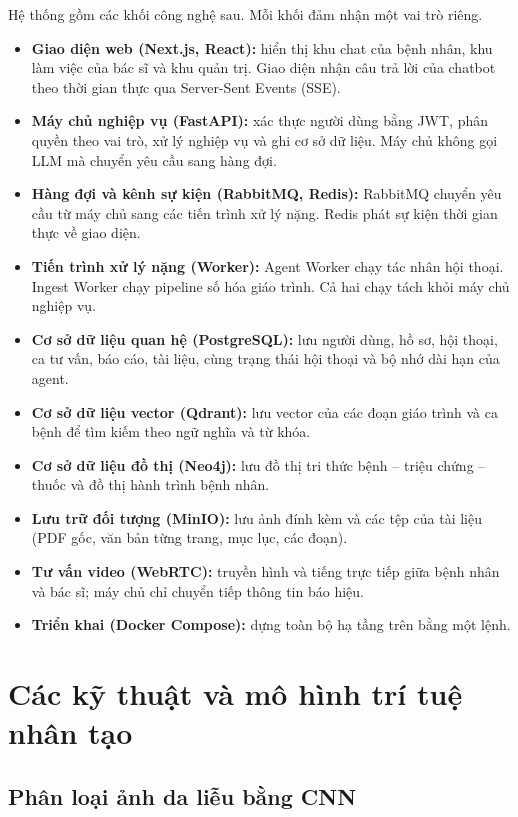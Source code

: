 Hệ thống gồm các khối công nghệ sau. Mỗi khối đảm nhận một vai trò riêng.

\begin{itemize}
  \item \textbf{Giao diện web (Next.js, React):} hiển thị khu chat của bệnh nhân, khu làm việc của bác sĩ và khu quản trị. Giao diện nhận câu trả lời của chatbot theo thời gian thực qua Server-Sent Events (SSE).
  \item \textbf{Máy chủ nghiệp vụ (FastAPI):} xác thực người dùng bằng JWT, phân quyền theo vai trò, xử lý nghiệp vụ và ghi cơ sở dữ liệu. Máy chủ không gọi LLM mà chuyển yêu cầu sang hàng đợi.
  \item \textbf{Hàng đợi và kênh sự kiện (RabbitMQ, Redis):} RabbitMQ chuyển yêu cầu từ máy chủ sang các tiến trình xử lý nặng. Redis phát sự kiện thời gian thực về giao diện.
  \item \textbf{Tiến trình xử lý nặng (Worker):} Agent Worker chạy tác nhân hội thoại. Ingest Worker chạy pipeline số hóa giáo trình. Cả hai chạy tách khỏi máy chủ nghiệp vụ.
  \item \textbf{Cơ sở dữ liệu quan hệ (PostgreSQL):} lưu người dùng, hồ sơ, hội thoại, ca tư vấn, báo cáo, tài liệu, cùng trạng thái hội thoại và bộ nhớ dài hạn của agent.
  \item \textbf{Cơ sở dữ liệu vector (Qdrant):} lưu vector của các đoạn giáo trình và ca bệnh để tìm kiếm theo ngữ nghĩa và từ khóa.
  \item \textbf{Cơ sở dữ liệu đồ thị (Neo4j):} lưu đồ thị tri thức bệnh -- triệu chứng -- thuốc và đồ thị hành trình bệnh nhân.
  \item \textbf{Lưu trữ đối tượng (MinIO):} lưu ảnh đính kèm và các tệp của tài liệu (PDF gốc, văn bản từng trang, mục lục, các đoạn).
  \item \textbf{Tư vấn video (WebRTC):} truyền hình và tiếng trực tiếp giữa bệnh nhân và bác sĩ; máy chủ chỉ chuyển tiếp thông tin báo hiệu.
  \item \textbf{Triển khai (Docker Compose):} dựng toàn bộ hạ tầng trên bằng một lệnh.
\end{itemize}

\section{Các kỹ thuật và mô hình trí tuệ nhân tạo}

\subsection{Phân loại ảnh da liễu bằng CNN}

